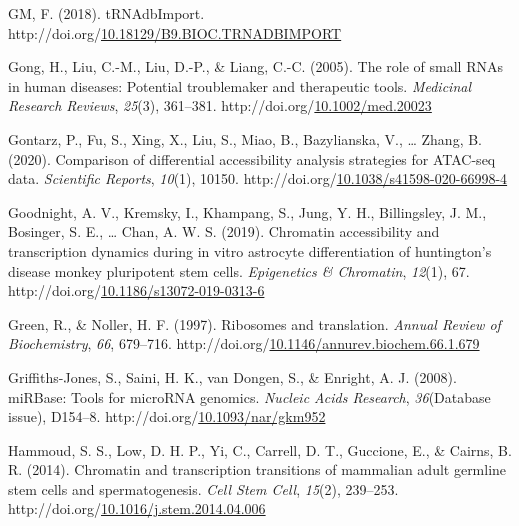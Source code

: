 \documentclass[12pt,twoside]{reedthesis}
\newlength{\cslhangindent}
\newenvironment{CSLReferences}[2] %
 {%
  \setlength{\parindent}{0pt}
  \ifodd #1 \everypar{\setlength{\hangindent}{\cslhangindent}}\ignorespaces\fi
  \ifnum #2 > 0
  \setlength{\parskip}{#2\baselineskip}
  \fi
 }%
 {}
\begin{document}
\begin{CSLReferences}{1}{0}
\leavevmode{}%
GM, F. (2018). tRNAdbImport. http://doi.org/\href{https://doi.org/10.18129/B9.BIOC.TRNADBIMPORT}{10.18129/B9.BIOC.TRNADBIMPORT}

\leavevmode{}%
Gong, H., Liu, C.-M., Liu, D.-P., \& Liang, C.-C. (2005). The role of small RNAs in human diseases: Potential troublemaker and therapeutic tools. \emph{Medicinal Research Reviews}, \emph{25}(3), 361--381. http://doi.org/\href{https://doi.org/10.1002/med.20023}{10.1002/med.20023}

\leavevmode{}%
Gontarz, P., Fu, S., Xing, X., Liu, S., Miao, B., Bazylianska, V., \ldots{} Zhang, B. (2020). Comparison of differential accessibility analysis strategies for ATAC-seq data. \emph{Scientific Reports}, \emph{10}(1), 10150. http://doi.org/\href{https://doi.org/10.1038/s41598-020-66998-4}{10.1038/s41598-020-66998-4}

\leavevmode{}%
Goodnight, A. V., Kremsky, I., Khampang, S., Jung, Y. H., Billingsley, J. M., Bosinger, S. E., \ldots{} Chan, A. W. S. (2019). Chromatin accessibility and transcription dynamics during in vitro astrocyte differentiation of huntington's disease monkey pluripotent stem cells. \emph{Epigenetics \& Chromatin}, \emph{12}(1), 67. http://doi.org/\href{https://doi.org/10.1186/s13072-019-0313-6}{10.1186/s13072-019-0313-6}

\leavevmode{}%
Green, R., \& Noller, H. F. (1997). Ribosomes and translation. \emph{Annual Review of Biochemistry}, \emph{66}, 679--716. http://doi.org/\href{https://doi.org/10.1146/annurev.biochem.66.1.679}{10.1146/annurev.biochem.66.1.679}

\leavevmode{}%
Griffiths-Jones, S., Saini, H. K., van Dongen, S., \& Enright, A. J. (2008). miRBase: Tools for microRNA genomics. \emph{Nucleic Acids Research}, \emph{36}(Database issue), D154--8. http://doi.org/\href{https://doi.org/10.1093/nar/gkm952}{10.1093/nar/gkm952}

\leavevmode{}%
Hammoud, S. S., Low, D. H. P., Yi, C., Carrell, D. T., Guccione, E., \& Cairns, B. R. (2014). Chromatin and transcription transitions of mammalian adult germline stem cells and spermatogenesis. \emph{Cell Stem Cell}, \emph{15}(2), 239--253. http://doi.org/\href{https://doi.org/10.1016/j.stem.2014.04.006}{10.1016/j.stem.2014.04.006}


\end{CSLReferences}
\end{document}
